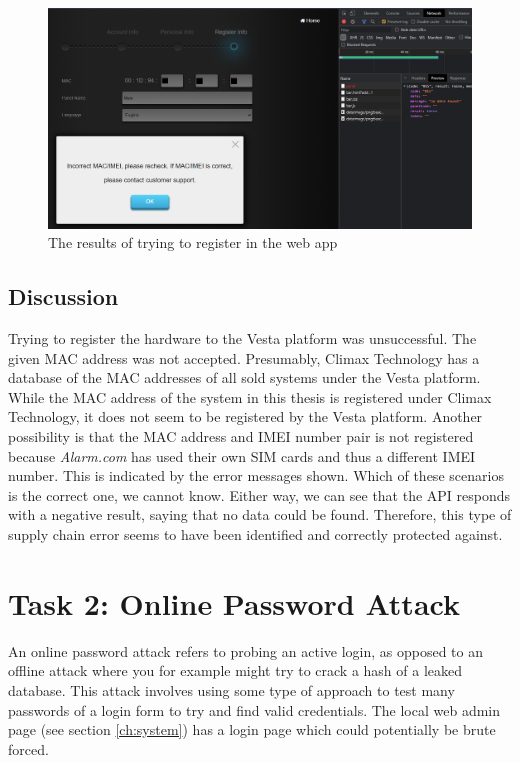 \begin{figure}[!ht]
    \centering
    \includegraphics[width=\textwidth]{images/6-pentesting/vesta-web-registration-failed.png}
    \caption{The results of trying to register in the web app}
    \label{fig:vesta-web-registration-failed}
\end{figure}

\subsection{Discussion}
Trying to register the hardware to the Vesta platform was unsuccessful. The given MAC address was not accepted. Presumably, Climax Technology has a database of the MAC addresses of all sold systems under the Vesta platform. While the MAC address of the system in this thesis is registered under Climax Technology, it does not seem to be registered by the Vesta platform. Another possibility is that the MAC address and IMEI number pair is not registered because \textit{Alarm.com} has used their own SIM cards and thus a different IMEI number. This is indicated by the error messages shown. Which of these scenarios is the correct one, we cannot know. Either way, we can see that the API responds with a negative result, saying that no data could be found. Therefore, this type of supply chain error seems to have been identified and correctly protected against.

\section{Task 2: Online Password Attack}
An online password attack refers to probing an active login, as opposed to an offline attack where you for example might try to crack a hash of a leaked database. This attack involves using some type of approach to test many passwords of a login form to try and find valid credentials. The local web admin page (see section \ref{ch:system}) has a login page which could potentially be brute forced.

